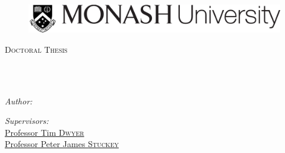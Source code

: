 \documentclass[
11pt, %
english, %
singlespacing, %
headsepline, %
]{MastersDoctoralThesis} %
\author{Shuai \textsc{Fu}} %
\begin{document}
\frontmatter %

\pagestyle{plain} %


\begin{titlepage}
\begin{center}

\vspace*{.06\textheight}
\begin{figure}
	\includegraphics[width=\linewidth]{figures/Monash}
\end{figure}
\textsc{\Large Doctoral Thesis}\\[0.5cm] %

\HRule \\[0.4cm] %
{\huge \bfseries \ttitle\par}\vspace{0.4cm} %
\HRule \\[1.5cm] %
 
\begin{minipage}[t]{0.4\textwidth}
\begin{flushleft} \large
\emph{Author:}\\
\href{http://www.johnsmith.com}{\authorname} %
\end{flushleft}
\end{minipage}
\begin{minipage}[t]{0.4\textwidth}
\begin{flushright} \large
\emph{Supervisors:} \\
\href{http://www.jamessmith.com}{Professor Tim \textsc{Dwyer}} \\
\href{http://www.jamessmith.com}{Professor Peter James \textsc{Stuckey}} 

\end{flushright}
\end{minipage}\\[3cm]
 

\end{center}
\end{titlepage}
\end{document}
